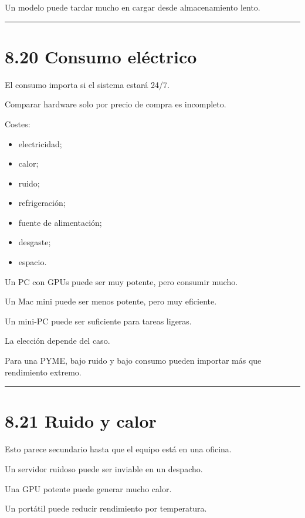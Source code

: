 Un modelo puede tardar mucho en cargar desde almacenamiento lento.

\begin{center}\rule{0.5\linewidth}{0.5pt}\end{center}

\section{8.20 Consumo eléctrico}\label{consumo-eluxe9ctrico}

El consumo importa si el sistema estará 24/7.

Comparar hardware solo por precio de compra es incompleto.

Costes:

\begin{itemize}
\tightlist
\item
  electricidad;
\item
  calor;
\item
  ruido;
\item
  refrigeración;
\item
  fuente de alimentación;
\item
  desgaste;
\item
  espacio.
\end{itemize}

Un PC con GPUs puede ser muy potente, pero consumir mucho.

Un Mac mini puede ser menos potente, pero muy eficiente.

Un mini-PC puede ser suficiente para tareas ligeras.

La elección depende del caso.

Para una PYME, bajo ruido y bajo consumo pueden importar más que
rendimiento extremo.

\begin{center}\rule{0.5\linewidth}{0.5pt}\end{center}

\section{8.21 Ruido y calor}\label{ruido-y-calor}

Esto parece secundario hasta que el equipo está en una oficina.

Un servidor ruidoso puede ser inviable en un despacho.

Una GPU potente puede generar mucho calor.

Un portátil puede reducir rendimiento por temperatura.


